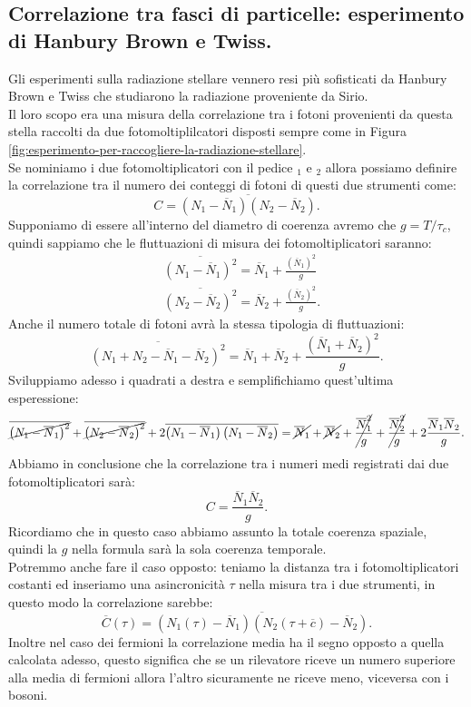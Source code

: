 \subsection{Correlazione tra fasci di particelle: esperimento di Hanbury Brown e Twiss.}
\label{subsec:Correlazione tra fasci di particelle}
Gli esperimenti sulla radiazione stellare vennero resi più sofisticati da Hanbury Brown e Twiss che studiarono la radiazione proveniente da Sirio.\\
Il loro scopo era una misura della correlazione tra i fotoni provenienti da questa stella raccolti da due fotomoltiplilcatori disposti sempre come in Figura \ref{fig:esperimento-per-raccogliere-la-radiazione-stellare}. \\
Se nominiamo i due fotomoltiplicatori con il pedice $_1$ e  $_2$ allora possiamo definire la correlazione tra il numero dei conteggi di fotoni di questi due strumenti come:
\[
	C = \overline{\left( N_1 - \overline{N}_1\right) \left( N_2-\overline{N}_2 \right)}
.\] 
Supponiamo di essere all'interno del diametro di coerenza avremo che $g = T /\tau_c$, quindi sappiamo che le fluttuazioni di misura dei fotomoltiplicatori saranno:
\[\begin{aligned}
	&\overline{\left( N_1-\overline{N}_1 \right)^2} 
	= 
	\overline{N}_1 + \frac{\left( \overline{N}_1 \right)^2}{g}\\
	&\overline{\left( N_2-\overline{N}_2 \right)^2} 
	= 
	\overline{N}_2 + \frac{\left( \overline{N}_2 \right)^2}{g}
.\end{aligned}\]
Anche il numero totale di fotoni avrà la stessa tipologia di fluttuazioni:
\[
	\overline{\left( N_1+N_2-\overline{N}_1-\overline{N}_2 \right)^2}
	=
	\overline{N}_1 + \overline{N}_2
	+
	\frac{\left( \overline{N}_1 + \overline{N}_2 \right)^2}{g}
.\] 
Sviluppiamo adesso i quadrati a destra e semplifichiamo quest'ultima esperessione:
\[\begin{aligned}
	\cancel{\overline{\left( N_1-\overline{N}_1 \right)^2}} 
	+
	\cancel{\overline{\left( N_2-\overline{N}_2 \right)^2}}
	+ 2 
	\overline{\left( N_1-\overline{N}_1 \right) \left( N_1-\overline{N}_2 \right) }
	=
	\cancel{\overline{N}_1} + \cancel{\overline{N}_2}
	+
	\cancel{\frac{\overline{N}_1^2}{g}} + \cancel{\frac{\overline{N}_2^2}{g}}
	+
	2 \frac{\overline{N}_1 \overline{N}_2}{g}
.\end{aligned}\]
Abbiamo in conclusione che la correlazione tra i numeri medi registrati dai due fotomoltiplicatori sarà:
\[
	C = \frac{\overline{N}_1 \overline{N}_2}{g} 
.\] 
Ricordiamo che in questo caso abbiamo assunto la totale coerenza spaziale, quindi la $g$ nella formula sarà la sola coerenza temporale. \\
Potremmo anche fare il caso opposto: teniamo la distanza tra i fotomoltiplicatori costanti ed inseriamo una asincronicità $\tau $ nella misura tra i due strumenti, in questo modo la correlazione sarebbe:
\[
	\overline{C}( \tau ) = 
	\overline{\left( N_1(\tau ) - \overline{N}_1 \right)
	\left( N_2( \tau + \overline{c}) - \overline{N}_2 \right) }
.\] 
Inoltre nel caso dei fermioni la correlazione media ha il segno opposto a quella calcolata adesso, questo significa che se un rilevatore riceve un numero superiore alla media di fermioni allora l'altro sicuramente ne riceve meno, viceversa con i bosoni.
